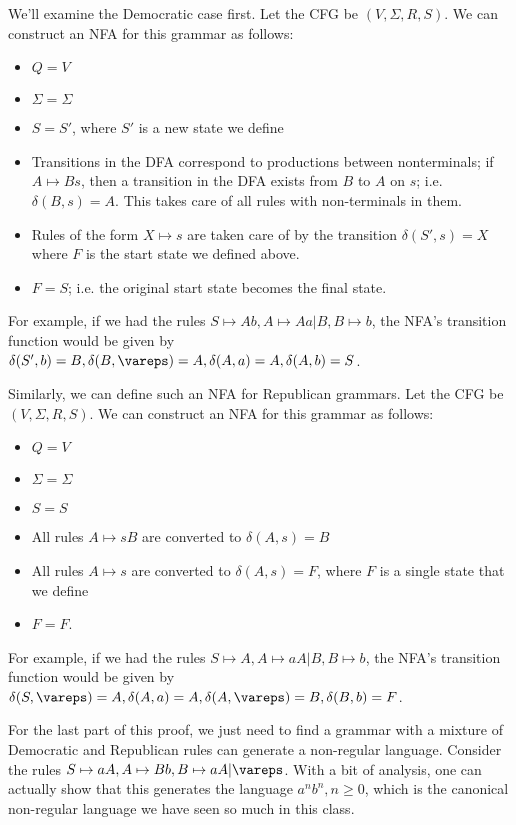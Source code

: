 \documentclass[solution, letterpaper]{cs121}
\begin{document}
\begin{solution}
We'll examine the Democratic case first.  Let the CFG be $(V, \Sigma, R, S)$.  We can construct an NFA for this grammar as follows:
\begin{itemize}
	\setlength\itemsep{0cm}
	\item $Q = V$
	\item $\Sigma = \Sigma$
	\item $S = S'$, where $S'$ is a new state we define
	\item Transitions in the DFA correspond to productions between nonterminals; if $A \mapsto Bs$, then a transition in the DFA exists from $B$ to $A$ on $s$; i.e. $\delta(B, s) = A$.  This takes care of all rules with non-terminals in them.
	\item Rules of the form $X \mapsto s$ are taken care of by the transition $\delta(S', s) = X$ where $F$ is the start state we defined above.
	\item $F = S$; i.e. the original start state becomes the final state.
\end{itemize}
\end{solution}

For example, if we had the rules $S \mapsto Ab, A \mapsto Aa | B, B \mapsto b$, the NFA's transition function would be given by $\delta(S', b) = B, \delta(B, \vareps) = A, \delta(A, a) = A, \delta(A, b) = S$.

Similarly, we can define such an NFA for Republican grammars.  Let the CFG be $(V, \Sigma, R, S)$.  We can construct an NFA for this grammar as follows:
\begin{itemize}
	\setlength\itemsep{0cm}
	\item $Q = V$
	\item $\Sigma = \Sigma$
	\item $S = S$
	\item All rules $A \mapsto sB$ are converted to $\delta(A, s) = B$
	\item All rules $A \mapsto s$ are converted to $\delta(A, s) = F$, where $F$ is a single state that we define
	\item $F = F$.
\end{itemize}

For example, if we had the rules $S \mapsto A, A \mapsto aA | B, B \mapsto b$, the NFA's transition function would be given by $\delta(S, \vareps) = A, \delta(A, a) = A, \delta(A, \vareps) = B, \delta(B, b) = F$.

For the last part of this proof, we just need to find a grammar with a mixture of Democratic and Republican rules can generate a non-regular language.  Consider the rules $S \mapsto aA, A \mapsto Bb, B \mapsto aA | \vareps$.  With a bit of analysis, one can actually show that this generates the language $a^nb^n, n \geq 0$, which is the canonical non-regular language we have seen so much in this class.
\end{document}
